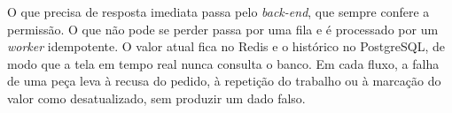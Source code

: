 \par O que precisa de resposta imediata passa pelo \emph{back-end}, que sempre confere a permissão. O que não pode se perder passa por uma fila e é processado por um \emph{worker} idempotente. O valor atual fica no Redis e o histórico no PostgreSQL, de modo que a tela em tempo real nunca consulta o banco. Em cada fluxo, a falha de uma peça leva à recusa do pedido, à repetição do trabalho ou à marcação do valor como desatualizado, sem produzir um dado falso.
